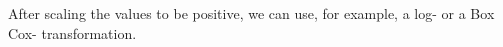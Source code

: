 \begin{answer}
	After scaling the values to be positive, we can use, for example, a log- or a Box Cox- transformation.
\end{answer}
